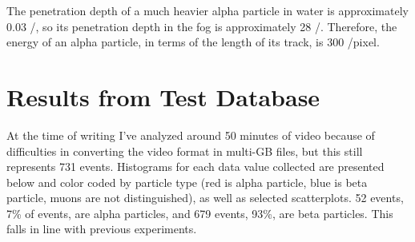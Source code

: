 \documentclass[notitlepage]{article}
\begin{document}
The penetration depth of a much heavier alpha particle in water is approximately 0.03 \centi{}\meter/\mega{}\electronvolt \cite{penetration,energies}, so its penetration depth in the fog is approximately 28 \centi{}\meter/\mega{}\electronvolt.  Therefore, the energy of an alpha particle, in terms of the length of its track, is 300 \electronvolt/pixel.

\section{Results from Test Database}

At the time of writing I've analyzed around 50 minutes of video because of difficulties in converting the video format in multi-GB files, but this still represents 731 events.  Histograms for each data value collected are presented below and color coded by particle type (red is alpha particle, blue is beta particle, muons are not distinguished), as well as selected scatterplots.  52 events, 7\% of events, are alpha particles, and 679 events, 93\%, are beta particles.  This falls in line with previous experiments.
\end{document}
